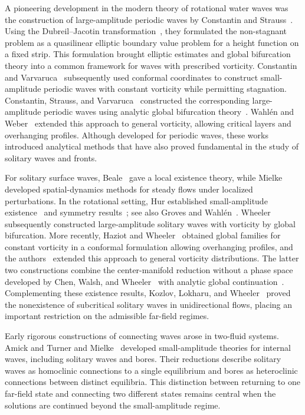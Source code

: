 \documentclass[12pt,letterpaper]{amsart}
\numberwithin{equation}{section}
\begin{document}
A pioneering development in the modern theory of rotational water waves was the construction of large-amplitude periodic waves by Constantin and Strauss~\cite{constantincpam04}. Using the Dubreil--Jacotin transformation~\cite{jacotijmpa}, they formulated the non-stagnant problem as a quasilinear elliptic boundary value problem for a height function on a fixed strip. This formulation brought elliptic estimates and global bifurcation theory into a common framework for waves with prescribed vorticity. Constantin and Varvaruca~\cite{constantinarma11} subsequently used conformal coordinates to construct small-amplitude periodic waves with constant vorticity while permitting stagnation. {Constantin, Strauss, and Varvaruca~\cite{constantinacta} constructed the corresponding large-amplitude periodic waves using analytic global bifurcation theory~\cite{BuffoniToland}. Wahl\'en and Weber~\cite{wahlenduke} extended this approach to general vorticity, allowing critical layers and overhanging profiles.}
Although developed for periodic waves, these works introduced analytical methods that have also proved fundamental in the study of solitary waves and fronts.

For solitary surface waves, Beale~\cite{Beale1977} gave a local existence theory, while Mielke~\cite{mielke86} developed spatial-dynamics methods for steady flows under localized perturbations. In the rotational setting, Hur established small-amplitude existence~\cite{hur08} and symmetry results~\cite{hurmrl}; see also Groves and Wahl\'en~\cite{gw}. Wheeler~\cite{milesjma} subsequently constructed large-amplitude solitary waves with vorticity by global bifurcation. More recently, Haziot and Wheeler~\cite{HaziotWheeler2023} obtained global families for constant vorticity in a conformal formulation allowing overhanging profiles, and the authors~\cite{ChuWangZhang2026} extended this approach to general vorticity distributions. {The latter two constructions combine the center-manifold reduction} without a phase space developed by Chen, Walsh, and Wheeler~\cite{chennonlinearity} with analytic global continuation~\cite{BuffoniToland}. {Complementing these existence results, Kozlov, Lokharu, and Wheeler}~\cite{kozlovarma21} proved the nonexistence of subcritical solitary waves in unidirectional flows, placing an important restriction on the admissible far-field regimes.

{Early rigorous constructions of connecting waves arose in two-fluid systems. Amick and Turner \cite{amick89} and Mielke~\cite{mielkebook} developed small-amplitude theories for internal waves, including solitary waves and bores. Their reductions describe solitary waves as homoclinic connections to a single equilibrium and bores as heteroclinic connections between distinct equilibria. This distinction between returning to one far-field state and connecting two different states remains central when the solutions are continued beyond the small-amplitude regime.}
\end{document}
